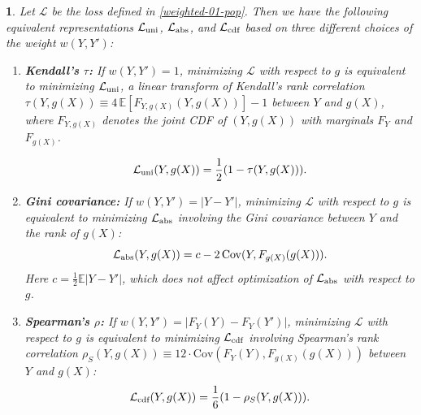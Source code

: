 \documentclass[11pt]{article}
\theoremstyle{plain}
\theoremstyle{plain}
\theoremstyle{plain}
\theoremstyle{plain}
\newtheorem{theorem}{\protect\theoremname}
\theoremstyle{plain}
\theoremstyle{plain}
\theoremstyle{plain}
\newenvironment{addedblock}{\begingroup\color{cairoaddedgreen}}{\endgroup}
\providecommand{\theoremname}{Theorem}
\begin{document}
\begin{theorem}
\label{thm:equivalence}
Let $\mathcal{L}$ be the loss defined in \eqref{weighted-01-pop}.  Then we have the following equivalent representations $\mathcal{L}_{\textup{uni}}$, $\mathcal{L}_{\textup{abs}}$, and $\mathcal{L}_{\textup{cdf}}$ based on three different choices of the weight $w(Y,Y')$:

\begin{enumerate}
    \item \textbf{Kendall's $\tau$:}
    \label{Kendall}
    \begin{addedblock}
    If $w(Y,Y') = 1$, minimizing $\mathcal{L}$ with respect to $g$ is equivalent to minimizing $\mathcal{L}_{\textup{uni}}$, a linear transform of Kendall's rank correlation $\tau(Y, g(X)) \equiv 4\,\mathbb{E}\!\left[F_{Y,g(X)}(Y,g(X))\right]-1$ between $Y$ and $g(X)$, where $F_{Y,g(X)}$ denotes the joint CDF of $(Y,g(X))$ with marginals $F_Y$ and $F_{g(X)}$. 
    
    \begin{equation}
        \mathcal{L}_{\textup{uni}}(Y, g(X)) = \frac{1}{2} ( 1 - \tau(Y, g(X)) ).
    \end{equation}
    \end{addedblock}

    \item \textbf{Gini covariance:}
    \label{Gini}
    If $w(Y,Y') = |Y - Y'|$, minimizing $\mathcal{L}$ with respect to $g$ is equivalent to minimizing $\mathcal{L}_{\textup{abs}}$ involving the Gini covariance between $Y$ and the rank of $g(X)$:
    \begin{equation}
        \mathcal{L}_{\textup{abs}}(Y, g(X)) = c - 2\operatorname{Cov}(Y, F_{g(X)}(g(X))).
    \label{eq: loss_abs}
    \end{equation}
    Here $c=\frac{1}{2}\mathbb{E}|Y-Y'|$, which does not affect optimization of $\mathcal{L}_{\textup{abs}}$ with respect to $g$. 
    \item \textbf{Spearman's $\rho$:}
    \label{Spearman}
    If $w(Y,Y') = |F_Y(Y) - F_Y(Y')|$, minimizing $\mathcal{L}$ with respect to $g$ is equivalent to minimizing $\mathcal{L}_{\textup{cdf}}$ involving Spearman's rank correlation $\rho_S(Y, g(X)) \equiv 12\cdot\mathrm{Cov}(F_Y(Y),F_{g(X)}(g(X)))$ between $Y$ and $g(X)$:
    \begin{equation}
        \mathcal{L}_{\textup{cdf}}(Y, g(X)) = \frac{1}{6} ( 1 - \rho_S(Y, g(X)) ).
    \end{equation}
\end{enumerate}


\end{theorem}
\end{document}
